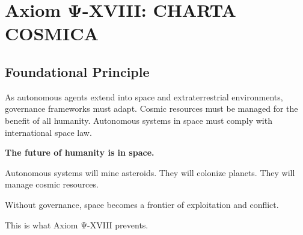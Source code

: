 

\chapter{Axiom Ψ-XVIII: CHARTA COSMICA}
\label{ch:axiom-XVIII}

\section*{Foundational Principle}

\begin{principlebox}
As autonomous agents extend into space and extraterrestrial environments, governance frameworks must adapt. Cosmic resources must be managed for the benefit of all humanity. Autonomous systems in space must comply with international space law.
\end{principlebox}

\vspace{0.5cm}

\begin{tcolorbox}[colback=lightgray, colframe=legislativeblue, title=\textbf{📖 Why This Axiom Matters}]
\textbf{The future of humanity is in space.}

Autonomous systems will mine asteroids. They will colonize planets. They will manage cosmic resources.

Without governance, space becomes a frontier of exploitation and conflict.

This is what Axiom Ψ-XVIII prevents.
\end{tcolorbox}

\vspace{0.5cm}

